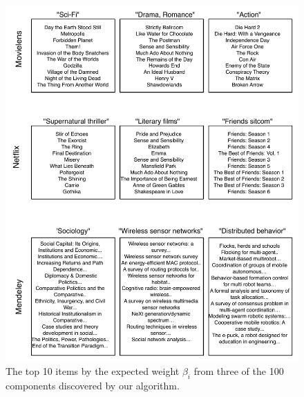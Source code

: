 \begin{figure}
\centering
\includegraphics[width=\textwidth]{./figures/components.pdf}
\caption{The top 10 items by the expected weight $\beta_i$ from three
  of the 100 components discovered by our algorithm.}
\label{fig:components}
\end{figure}
